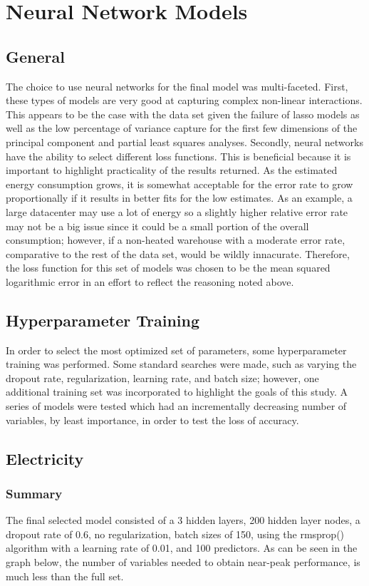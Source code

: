 
\section*{Neural Network Models}
\label{sec:nn_models}

\subsection{General}
The choice to use neural networks for the final model was multi-faceted.  First, these types of models are very good at capturing complex non-linear interactions.  This appears to be the case with the data set given the failure of lasso models as well as the low percentage of variance capture for the first few dimensions of the principal component and partial least squares analyses.  Secondly, neural networks have the ability to select different loss functions.  This is beneficial because it is important to highlight practicality of the results returned.  As the estimated energy consumption grows, it is somewhat acceptable for the error rate to grow proportionally if it results in better fits for the low estimates.  As an example, a large datacenter may use a lot of energy so a slightly higher relative error rate may not be a big issue since it could be a small portion of the overall consumption; however, if a non-heated warehouse with a moderate error rate, comparative to the rest of the data set, would be wildly innacurate.  Therefore, the loss function for this set of models was chosen to be the mean squared logarithmic error in an effort to reflect the reasoning noted above.

\subsection{Hyperparameter Training}
In order to select the most optimized set of parameters, some hyperparameter training was performed.  Some standard searches were made, such as varying the dropout rate, regularization, learning rate, and batch size; however, one additional training set was incorporated to highlight the goals of this study.  A series of models were tested which had an incrementally decreasing number of variables, by least importance, in order to test the loss of accuracy.
\newpage
\subsection{Electricity}
\subsubsection{Summary}
The final selected model consisted of a 3 hidden layers, 200 hidden layer nodes, a dropout rate of 0.6, no regularization, batch sizes of 150, using the rmsprop() algorithm with a learning rate of 0.01, and 100 predictors.  As can be seen in the graph below, the number of variables needed to obtain near-peak performance, is much less than the full set.

